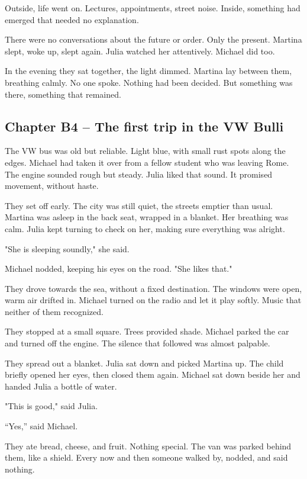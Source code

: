\documentclass[
]{article}
\begin{document}
Outside, life went on. Lectures, appointments, street noise. Inside, something had emerged that needed no explanation.

There were no conversations about the future or order. Only the present. Martina slept, woke up, slept again. Julia watched her attentively. Michael did too.

In the evening they sat together, the light dimmed. Martina lay between them, breathing calmly. No one spoke. Nothing had been decided. But something was there, something that remained.

\subsection{Chapter B4 -- The first trip in the VW Bulli}\label{chapter-b4-the-first-trip-in-the-vw-bulli}

The VW bus was old but reliable. Light blue, with small rust spots along the edges. Michael had taken it over from a fellow student who was leaving Rome. The engine sounded rough but steady. Julia liked that sound. It promised movement, without haste.

They set off early. The city was still quiet, the streets emptier than usual. Martina was asleep in the back seat, wrapped in a blanket. Her breathing was calm. Julia kept turning to check on her, making sure everything was alright.

"She is sleeping soundly," she said.

Michael nodded, keeping his eyes on the road. "She likes that."

They drove towards the sea, without a fixed destination. The windows were open, warm air drifted in. Michael turned on the radio and let it play softly. Music that neither of them recognized.

They stopped at a small square. Trees provided shade. Michael parked the car and turned off the engine. The silence that followed was almost palpable.

They spread out a blanket. Julia sat down and picked Martina up. The child briefly opened her eyes, then closed them again. Michael sat down beside her and handed Julia a bottle of water.

"This is good," said Julia.

``Yes,'' said Michael.

They ate bread, cheese, and fruit. Nothing special. The van was parked behind them, like a shield. Every now and then someone walked by, nodded, and said nothing.
\end{document}
